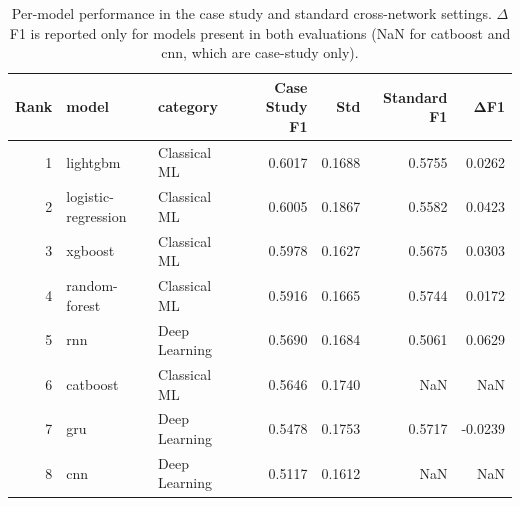 \begin{table}
\caption{Per-model performance in the case study and standard cross-network settings. $\Delta$F1 is reported only for models present in both evaluations (NaN for catboost and cnn, which are case-study only).}
\label{tab:q6_models}
\begin{tabular}{rllrrrr}
\toprule
Rank & model & category & Case Study F1 & Std & Standard F1 & ΔF1 \\
\midrule
1 & lightgbm & Classical ML & 0.6017 & 0.1688 & 0.5755 & 0.0262 \\
2 & logistic-regression & Classical ML & 0.6005 & 0.1867 & 0.5582 & 0.0423 \\
3 & xgboost & Classical ML & 0.5978 & 0.1627 & 0.5675 & 0.0303 \\
4 & random-forest & Classical ML & 0.5916 & 0.1665 & 0.5744 & 0.0172 \\
5 & rnn & Deep Learning & 0.5690 & 0.1684 & 0.5061 & 0.0629 \\
6 & catboost & Classical ML & 0.5646 & 0.1740 & NaN & NaN \\
7 & gru & Deep Learning & 0.5478 & 0.1753 & 0.5717 & -0.0239 \\
8 & cnn & Deep Learning & 0.5117 & 0.1612 & NaN & NaN \\
\bottomrule
\end{tabular}
\end{table}
